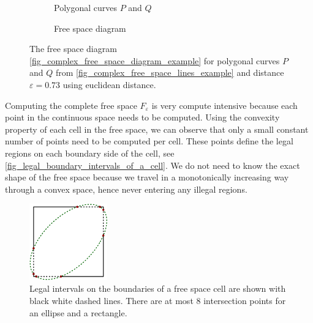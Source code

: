 \documentclass[
oneside,
fontsize=11pt
]{scrartcl}
\begin{document}
\begin{figure}[ht]
  \centering
  \begin{subfigure}[b]{0.45\textwidth}
      \resizebox{\textwidth}{!}{
        
      }
      \caption{Polygonal curves $P$ and $Q$}
      \label{fig_complex_free_space_lines_example}
  \end{subfigure}
  \hfill
  \begin{subfigure}[b]{0.45\textwidth}
      \resizebox{\textwidth}{!}{
        
      }
      \caption{Free space diagram}
      \label{fig_complex_free_space_diagram_example}
  \end{subfigure}
  \caption[Complex free space diagram example]{
    The free space diagram \autoref{fig_complex_free_space_diagram_example} 
    for polygonal curves $P$ and $Q$ from \autoref{fig_complex_free_space_lines_example} 
    and distance $\varepsilon = 0.73$ using euclidean distance.}
  \label{fig_complex_free_space}
\end{figure}

Computing the complete free space $F_\varepsilon$ is very compute intensive 
because each point in the continuous space needs to be computed. 
Using the convexity property of each cell in the free space,
we can observe that only a small constant number of points need to be computed per cell. 
These points define the legal regions on each boundary side of the cell, see \autoref{fig_legal_boundary_intervals_of_a_cell}. 
We do not need to know the exact shape of the free space 
because we travel in a monotonically increasing way through a convex space,
hence never entering any illegal regions.

\begin{figure}[ht]
  \centering
  \includegraphics[width=0.3\textwidth]{images/frechet_distance/square-ellipse-intersection.pdf}
  \caption[Legal intervals on free space cell boundary]{
    Legal intervals on the boundaries of a free space cell are shown with black white dashed lines. 
    There are at most 8 intersection points for an ellipse and a rectangle.}
  \label{fig_legal_boundary_intervals_of_a_cell}
\end{figure}
\end{document}
